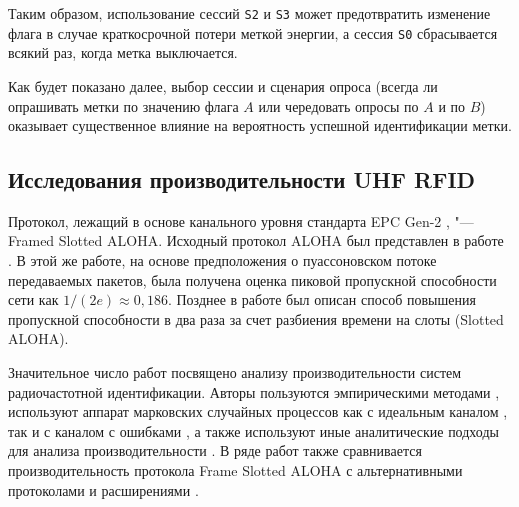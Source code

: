 Таким образом, использование сессий \texttt{S2} и \texttt{S3} может предотвратить изменение флага в случае краткосрочной потери меткой энергии, а сессия \texttt{S0} сбрасывается всякий раз, когда метка выключается.

Как будет показано далее, выбор сессии и сценария опроса (всегда ли опрашивать метки по значению флага $A$ или чередовать опросы по $A$ и по $B$) оказывает существенное влияние на вероятность успешной идентификации метки.



\subsection{Исследования производительности UHF RFID}

Протокол, лежащий в основе канального уровня стандарта EPC Gen-2 \cite{std_gen2}, "--- Framed Slotted ALOHA. Исходный протокол ALOHA был представлен в работе \cite{Roberts1975}. В этой же работе, на основе предположения о пуассоновском потоке передаваемых пакетов, была получена оценка пиковой пропускной способности сети как $1/(2e) \approx 0,186$. Позднее в работе \cite{Abramson1970} был описан способ повышения пропускной способности в два раза за счет разбиения времени на слоты (Slotted ALOHA).

Значительное число работ посвящено анализу производительности систем радиочастотной идентификации. Авторы пользуются эмпирическими методами \cite{Buettner2008}, используют аппарат марковских случайных процессов как с идеальным каналом \cite{Wang2009, Vahedi2012, Vales-Alonso2009, Vales-Alonso2011, Qiaoling2007}, так и с каналом с ошибками \cite{DiMarco2014}, а также используют иные аналитические подходы для анализа производительности \cite{Ahmed2016, Yan2014, Jeon2009}. В ряде работ также сравнивается производительность протокола Frame Slotted ALOHA с альтернативными протоколами и расширениями \cite{Vahedi2014, LaPorta2011}.

